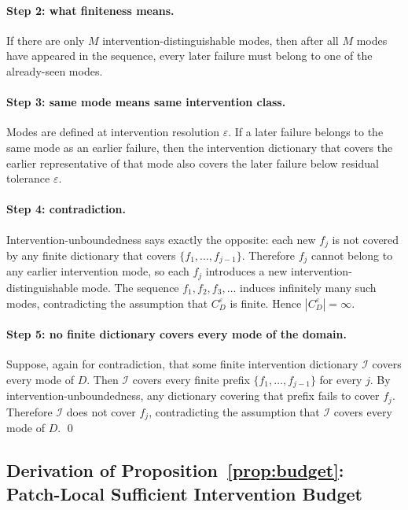 \documentclass{article}
\theoremstyle{taeplain}
\theoremstyle{taedefn}
\begin{document}
\paragraph{Step 2: what finiteness means.}
If there are only $M$ intervention-distinguishable modes, then after all $M$ modes have appeared in the sequence, every later failure must belong to one of the already-seen modes.

\paragraph{Step 3: same mode means same intervention class.}
Modes are defined at intervention resolution $\varepsilon$. If a later failure belongs to the same mode as an earlier failure, then the intervention dictionary that covers the earlier representative of that mode also covers the later failure below residual tolerance $\varepsilon$.

\paragraph{Step 4: contradiction.}
Intervention-unboundedness says exactly the opposite: each new $f_j$ is not covered by any finite dictionary that covers $\{f_1, \ldots, f_{j-1}\}$. Therefore $f_j$ cannot belong to any earlier intervention mode, so each $f_j$ introduces a new intervention-distinguishable mode. The sequence $f_1, f_2, f_3, \ldots$ induces infinitely many such modes, contradicting the assumption that $C_D^{\varepsilon}$ is finite. Hence $|C_D^{\varepsilon}| = \infty$.

\paragraph{Step 5: no finite dictionary covers every mode of the domain.}
Suppose, again for contradiction, that some finite intervention dictionary $\mathcal{I}$ covers every mode of $D$. Then $\mathcal{I}$ covers every finite prefix $\{f_1, \ldots, f_{j-1}\}$ for every $j$. By intervention-unboundedness, any dictionary covering that prefix fails to cover $f_j$. Therefore $\mathcal{I}$ does not cover $f_j$, contradicting the assumption that $\mathcal{I}$ covers every mode of $D$. \qed

\subsection{Derivation of Proposition~\ref{prop:budget}: Patch-Local Sufficient Intervention Budget}
\label{app:proof-budget}
\end{document}
